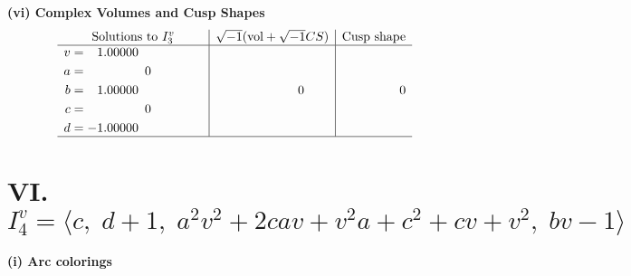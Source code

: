 \documentclass[1p]{elsarticle_modified}
\theoremstyle{definition}
\newcommand{\I}{\sqrt{-1}}
\begin{document}
\newpage\flushleft \textbf{(vi) Complex Volumes and Cusp Shapes}
$$\begin{array}{c|c|c}  
\text{Solutions to }I^v_{3}& \I (\text{vol} + \sqrt{-1}CS) & \text{Cusp shape}\\
 \hline 
\begin{aligned}
v &= \phantom{-}1.00000\phantom{ +0.000000I} \\
a &= \phantom{-0.000000 } 0 \\
b &= \phantom{-}1.00000\phantom{ +0.000000I} \\
c &= \phantom{-0.000000 } 0 \\
d &= -1.00000\phantom{ +0.000000I}\end{aligned}
 & \phantom{-0.000000 } 0 & \phantom{-0.000000 } 0\\
 \hline 
 \end{array}$$\newpage\newpage\renewcommand{\arraystretch}{1}
\centering \section*{VI. $I^v_{4}= \langle c,\;d+1,\;a^2 v^2+2 c a v+v^2 a+c^2+c v+v^2,\;b v-1 \rangle$}
\flushleft \textbf{(i) Arc colorings}\\
\end{document}
